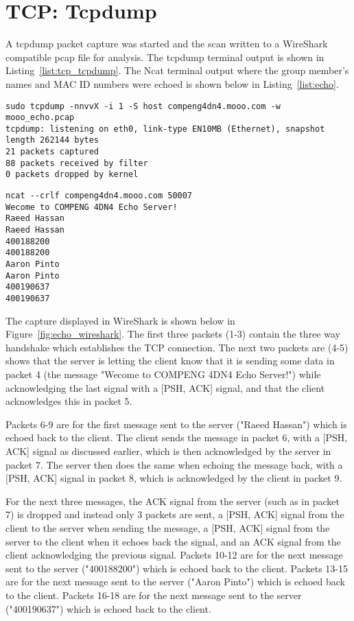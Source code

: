 \section*{TCP: Tcpdump}
A tcpdump packet capture was started and the scan written to a WireShark compatible pcap file for analysis. The tcpdump terminal output is shown in Listing~\ref{list:tcp_tcpdump}. The Ncat terminal output where the group member's names and MAC ID numbers were echoed is shown below in Listing~\ref{list:echo}.

\begin{lstlisting}[caption=Tcpdump Packet Capture of Python Echo Server Connection,label=list:tcp_tcpdump]
sudo tcpdump -nnvvX -i 1 -S host compeng4dn4.mooo.com -w mooo_echo.pcap
tcpdump: listening on eth0, link-type EN10MB (Ethernet), snapshot length 262144 bytes
21 packets captured
88 packets received by filter
0 packets dropped by kernel
\end{lstlisting}

\begin{lstlisting}[caption=Ncat Connection to Python Echo Server,label=list:echo]
ncat --crlf compeng4dn4.mooo.com 50007
Wecome to COMPENG 4DN4 Echo Server!
Raeed Hassan
Raeed Hassan
400188200
400188200
Aaron Pinto
Aaron Pinto
400190637
400190637
\end{lstlisting}

The capture displayed in WireShark is shown below in Figure~\ref{fig:echo_wireshark}. The first three packets (1-3) contain the three way handshake which establishes the TCP connection. The next two packets are (4-5) shows that the server is letting the client know that it is sending some data in packet 4 (the message "Wecome to COMPENG 4DN4 Echo Server!") while acknowledging the last signal with a [PSH, ACK] signal, and that the client acknowledges this in packet 5. 

Packets 6-9 are for the first message sent to the server ("Raeed Hassan") which is echoed back to the client. The client sends the message in packet 6, with a [PSH, ACK] signal as discussed earlier, which is then acknowledged by the server in packet 7. The server then does the same when echoing the message back, with a [PSH, ACK] signal in packet 8, which is acknowledged by the client in packet 9. 

For the next three messages, the ACK signal from the server (such as in packet 7) is dropped and instead only 3 packets are sent, a [PSH, ACK] signal from the client to the server when sending the message, a [PSH, ACK] signal from the server to the client when it echoes back the signal, and an ACK signal from the client acknowledging the previous signal. Packets 10-12 are for the next message sent to the server ("400188200") which is echoed back to the client. Packets 13-15 are for the next message sent to the server ("Aaron Pinto") which is echoed back to the client. Packets 16-18 are for the next message sent to the server ("400190637") which is echoed back to the client. 

